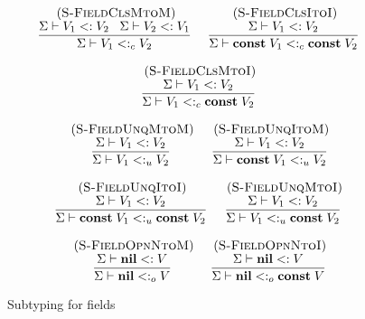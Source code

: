 \documentclass[preprint]{sigplanconf}
\newcommand{\Nil}{\mathbf{nil}}
\newcommand{\Const}{\mathbf{const}}
\newcommand{\mylabel}[1]{\; (\textsc{#1})}
\newcommand{\senv}{\Sigma}
\newcommand{\subtype}{<:}
\begin{document}
\begin{figure}[t]
\label{fig:subfield}
\[
\begin{array}{c}
\begin{array}{c}
\mylabel{S-FieldClsMtoM}\\
\dfrac{\senv \vdash V_{1} \subtype V_{2} \;\;\;
	\senv \vdash V_{2} \subtype V_{1}}
{\senv \vdash V_{1} \subtype_{c} V_{2}}
\end{array}
\;
\begin{array}{c}
\mylabel{S-FieldClsItoI}\\
\dfrac{\senv \vdash V_{1} \subtype V_{2}}
{\senv \vdash \Const \; V_{1} \subtype_{c} \Const \; V_{2}}
\end{array}
\\ \\
\begin{array}{c}
\mylabel{S-FieldClsMtoI}\\
\dfrac{\senv \vdash V_{1} \subtype V_{2}}
{\senv \vdash V_{1} \subtype_{c} \Const \; V_{2}}
\end{array}\\\\
\begin{array}{c}
\mylabel{S-FieldUnqMtoM}\\
\dfrac{\senv \vdash V_{1} \subtype V_{2}}
{\senv \vdash V_{1} \subtype_{u} V_{2}}
\end{array}
\;
\begin{array}{c}
\mylabel{S-FieldUnqItoM}\\
\dfrac{\senv \vdash V_{1} \subtype V_{2}}
{\senv \vdash \Const \; V_{1} \subtype_{u} V_{2}}
\end{array}
\\ \\
\begin{array}{c}
\mylabel{S-FieldUnqItoI}\\
\dfrac{\senv \vdash V_{1} \subtype V_{2}}
{\senv \vdash \Const \; V_{1} \subtype_{u} \Const \; V_{2}}
\end{array}
\;
\begin{array}{c}
\mylabel{S-FieldUnqMtoI}\\
\dfrac{\senv \vdash V_{1} \subtype V_{2}}
{\senv \vdash V_{1} \subtype_{u} \Const \; V_{2}}
\end{array}
\\ \\
\begin{array}{c}
\mylabel{S-FieldOpnNtoM}\\
\dfrac{\senv \vdash \Nil \subtype V}
{\senv \vdash \Nil \subtype_{o} V}
\end{array}
\;
\begin{array}{c}
\mylabel{S-FieldOpnNtoI}\\
\dfrac{\senv \vdash \Nil \subtype V}
{\senv \vdash \Nil \subtype_{o} \Const \; V}
\end{array}
\end{array}
\]
\caption{Subtyping for fields}
\end{figure}
\end{document}
